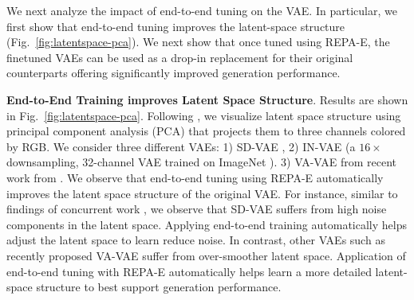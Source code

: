 \documentclass[10pt,twocolumn,letterpaper]{article}
\begin{document}
We next analyze the impact of end-to-end tuning on the VAE. In particular, we first show that end-to-end tuning improves the latent-space structure (Fig.~\ref{fig:latentspace-pca}). We next show that once tuned using REPA-E, the finetuned VAEs can be used as a drop-in replacement for their original counterparts offering significantly improved generation performance.

\textbf{End-to-End Training improves Latent Space Structure}. Results are shown in Fig.~\ref{fig:latentspace-pca}. Following \cite{eqvae}, we visualize latent space structure using principal component analysis (PCA) that projects them to three channels colored by RGB. We consider three different VAEs: 1) SD-VAE \cite{ldm},  2) IN-VAE (a $16\times$ downsampling, 32-channel VAE trained on ImageNet \cite{imgnet}).
3) VA-VAE from recent work from \cite{ldit}. We observe that end-to-end tuning using REPA-E automatically improves the latent space structure of the original VAE. 
For instance, similar to findings of concurrent work \cite{diffusability}, we observe that SD-VAE suffers from high noise components in the latent space. Applying end-to-end training automatically helps adjust the latent space to learn reduce noise. In contrast, other VAEs such as recently proposed VA-VAE \cite{ldit} suffer from over-smoother latent space. Application of end-to-end tuning with REPA-E automatically helps learn a more detailed latent-space structure to best support generation performance.
\end{document}
